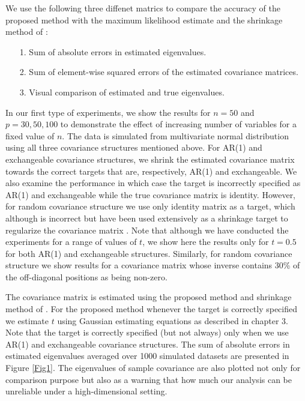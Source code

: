  
We use the following three diffenet matrics to compare the accuracy of the proposed method with the maximum likelihood estimate and the shrinkage method of \cite{schafer2005shrinkage}:
 \begin{itemize}
 \item[1.] Sum of absolute errors in estimated eigenvalues.
 \item[2.] Sum of element-wise squared errors of the estimated covariance matrices.
 \item[3.] Visual comparison of estimated and true eigenvalues.
 \end{itemize}
   
In our first type of experiments, we show the results for $n=50$ and $p=  30, 50, 100$ to demonstrate the effect of increasing number of variables for a fixed value of $n$. The data is simulated from multivariate normal distribution using all three covariance structures mentioned above. For AR(1) and exchangeable covariance structures, we shrink the estimated covariance matrix towards the correct targets that are, respectively, AR(1) and exchangeable. We also examine the performance in which case the target is incorrectly specified as AR(1) and exchangeable while the true covariance matrix is identity. However, for random covariance structure we use only identity matrix as a target, which although is incorrect but have been used extensively as a shrinkage target to regularize the covariance matrix \cite{ledoit2003improved, schafer2005shrinkage}. Note that although we have conducted the experiments for a range of values of $t$, we show here the results only for $t=0.5$ for both AR(1) and exchangeable structures. Similarly, for random covariance structure we show results for a covariance matrix whose inverse contains 30\% of the off-diagonal positions as being non-zero. 

The covariance matrix is estimated using the proposed method and shrinkage method of \cite{schafer2005shrinkage}. For the proposed method whenever the target is correctly specified we estimate $t$ using Gaussian estimating equations as described in chapter 3. Note that the target is correctly specified (but not always) only when we use AR(1) and exchangeable covariance structures. The sum of absolute errors in estimated eigenvalues averaged over 1000 simulated datasets are presented in Figure \ref{Fig1}. The eigenvalues of sample covariance are also plotted not only for comparison purpose but also as a warning that how much our analysis can be unreliable under a high-dimensional setting.

